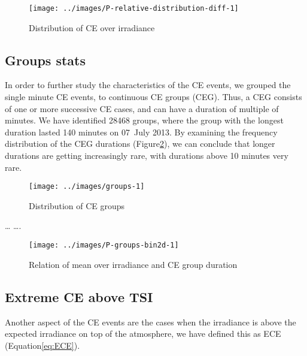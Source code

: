 \documentclass[preprint, 3p,
authoryear]{elsarticle} %
\begin{document}
\begin{figure}

{\centering \texttt{[image: ../images/P-relative-distribution-diff-1]} 

}

\caption{Distribution of CE over irradiance}\label{fig:ovir-distribution}
\end{figure}

\hypertarget{groups-stats}{%
\subsection{Groups stats}\label{groups-stats}}

In order to further study the characteristics of the CE events, we
grouped the single minute CE events, to continuous CE groups (CEG).
Thus, a CEG consists of one or more successive CE cases, and can have a
duration of multiple of minutes. We have identified 28468 groups, where
the group with the longest duration lasted 140 minutes on 07~July 2013.
By examining the frequency distribution of the CEG durations
(Figure\nobreakspace{}\ref{fig:ceg-duration-distribution}), we can
conclude that longer durations are getting increasingly rare, with
durations above 10 minutes very rare.

\begin{figure}

{\centering \texttt{[image: ../images/groups-1]} 

}

\caption{Distribution of CE groups}\label{fig:ceg-duration-distribution}
\end{figure}

\ldots{} \citet{Zhang2018} \ldots.

\begin{figure}

{\centering \texttt{[image: ../images/P-groups-bin2d-1]} 

}

\caption{Relation of mean over irradiance and CE group duration}\label{fig:unnamed-chunk-3}
\end{figure}

\hypertarget{extreme-ce-above-tsi}{%
\subsection{Extreme CE above TSI}\label{extreme-ce-above-tsi}}

Another aspect of the CE events are the cases when the irradiance is
above the expected irradiance on top of the atmosphere, we have defined
this as ECE (Equation\nobreakspace{}\ref{eq:ECE}).
\end{document}
